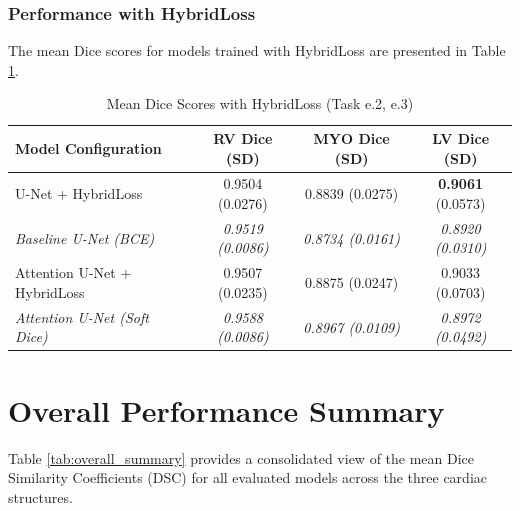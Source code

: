 \documentclass{article}
\begin{document}
\subsubsection{Performance with HybridLoss}
The mean Dice scores for models trained with HybridLoss are presented in Table \ref{tab:hybridloss_results}.
\begin{table}[H]
  \centering
  \caption{Mean Dice Scores with HybridLoss (Task e.2, e.3)}
  \label{tab:hybridloss_results}
  \begin{tabular}{l|c|c|c}
    \toprule
    Model Configuration                  & RV Dice (SD)             & MYO Dice (SD)            & LV Dice (SD)             \\
    \midrule
    U-Net + HybridLoss                   & 0.9504 (0.0276)          & 0.8839 (0.0275)          & \textbf{0.9061} (0.0573) \\
    \textit{Baseline U-Net (BCE)}        & \textit{0.9519 (0.0086)} & \textit{0.8734 (0.0161)} & \textit{0.8920 (0.0310)} \\
    \midrule
    Attention U-Net + HybridLoss         & 0.9507 (0.0235)          & 0.8875 (0.0247)          & 0.9033 (0.0703)          \\
    \textit{Attention U-Net (Soft Dice)} & \textit{0.9588 (0.0086)} & \textit{0.8967 (0.0109)} & \textit{0.8972 (0.0492)} \\
    \bottomrule
  \end{tabular}
\end{table}


\section{Overall Performance Summary}
Table \ref{tab:overall_summary} provides a consolidated view of the mean Dice Similarity Coefficients (DSC) for all evaluated models across the three cardiac structures.
\end{document}
